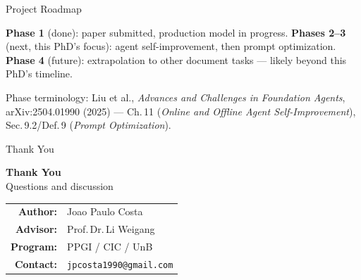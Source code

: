 \documentclass[aspectratio=169,10pt]{beamer}
\begin{document}
\begin{frame}{Project Roadmap}
\begin{center}
\end{center}

\vspace{4pt}
{\footnotesize\color{black!55}
\textbf{Phase 1} (done): paper submitted, production model in progress.
\textbf{Phases 2--3} (next, this PhD's focus): agent self-improvement,
then prompt optimization. \textbf{Phase 4} (future): extrapolation to other
document tasks --- likely beyond this PhD's timeline.}

\vspace{2pt}
{\tiny\color{black!45} Phase terminology: Liu et al., \textit{Advances and
Challenges in Foundation Agents}, arXiv:2504.01990 (2025) --- Ch.\,11
(\textit{Online and Offline Agent Self-Improvement}), Sec.\,9.2/Def.\,9
(\textit{Prompt Optimization}).}

\end{frame}

\begin{frame}{Thank You}
  \begin{center}
    \vspace{12pt}
    {\Large\bfseries\color{unbblue} Thank You}\\[8pt]
    {\normalsize Questions and discussion}\\[20pt]
    \footnotesize
    \begin{tabular}{rl}
      \textbf{Author:}  & Joao Paulo Costa \\
      \textbf{Advisor:} & Prof.\,Dr.\,Li Weigang \\
      \textbf{Program:} & PPGI / CIC / UnB \\
      \textbf{Contact:} & \texttt{jpcosta1990@gmail.com} \\
    \end{tabular}
  \end{center}
\end{frame}
\end{document}
